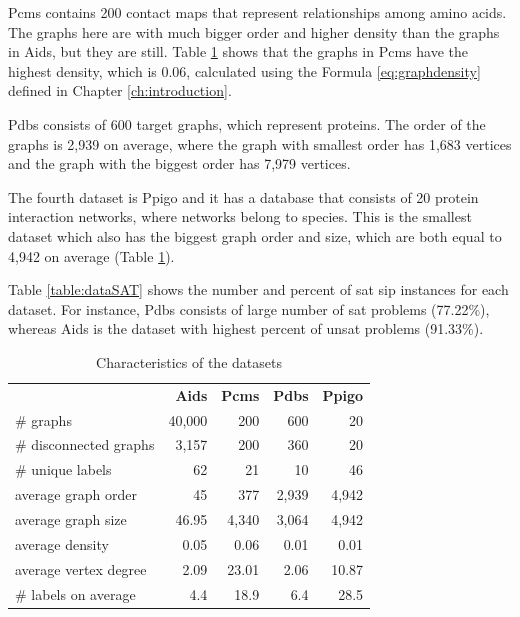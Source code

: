 \documentclass{l4proj}
\begin{document}
Pcms contains 200 contact maps that represent relationships among amino acids. The graphs here are with much bigger order and higher density than the graphs in Aids, but they are still. Table \ref{table:datasets} shows that the graphs in Pcms have the highest density, which is 0.06, calculated using the Formula \ref{eq:graphdensity} defined in Chapter \ref{ch:introduction}. 

Pdbs consists of 600 target graphs, which represent proteins. The order of the graphs is 2,939 on average, where the graph with smallest order has 1,683 vertices and the graph with the biggest order has 7,979 vertices.

The fourth dataset is Ppigo and it has a database that consists of 20 protein interaction networks, where networks belong to species. This is the smallest dataset which also has the biggest graph order and size, which are both equal to 4,942 on average (Table \ref{table:datasets}).

Table \ref{table:dataSAT} shows the number and percent of \gls{sat} \gls{sip} instances for each dataset. For instance, Pdbs consists of large number of \gls{sat} problems (77.22\%), whereas Aids is the dataset with highest percent of \gls{unsat} problems (91.33\%).

\begin{table}
\centering
        \renewcommand{\arraystretch}{1.4}%
        \begin{tabular}{l|r|r|r|r|}
\cline{2-5}
& \textbf{Aids} & \textbf{Pcms} & \textbf{Pdbs} & \textbf{Ppigo} \\
\cline{1-5}
\multicolumn{1}{|l|}{\# graphs}  & 40,000 & 200	& 600   & 20 \\
\hline
\multicolumn{1}{|l|}{\# disconnected graphs} & 3,157 & 200 & 360 & 20 \\
\hline
\multicolumn{1}{|l|}{\# unique labels} & 62 & 21 & 10 & 46 \\
\hline
\multicolumn{1}{|l|}{average graph order} & 45 & 377 & 2,939 & 4,942 \\
\hline
\multicolumn{1}{|l|}{average graph size} & 46.95 & 4,340 & 3,064 & 4,942 \\
\hline
\multicolumn{1}{|l|}{average density} & 0.05 & 0.06 & 0.01 & 0.01 \\
\hline
\multicolumn{1}{|l|}{average vertex degree} & 2.09 & 23.01 & 2.06 & 10.87 \\
\hline
\multicolumn{1}{|l|}{\# labels on average} & 4.4 & 18.9 & 6.4 & 28.5 \\
\hline
\end{tabular}
\caption{Characteristics of the datasets}
\label{table:datasets}
\end{table}
\end{document}
